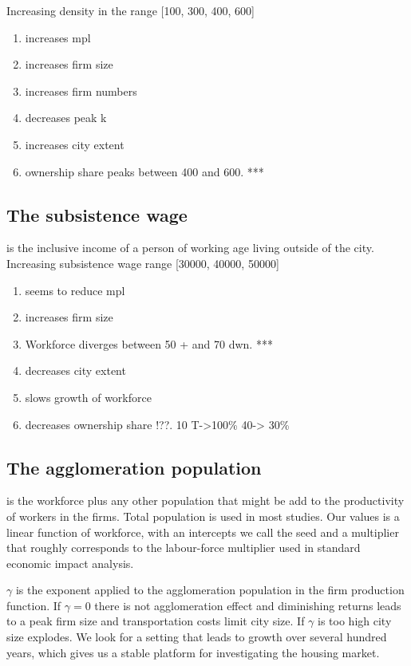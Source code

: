 Increasing density in the range [100, 300, 400, 600]    \begin{enumerate}
        \item increases mpl
        \item increases firm size
        \item increases firm numbers
        \item decreases peak k
        \item increases city extent
        \item ownership share peaks between 400 and 600. ***
    \end{enumerate}


\subsection{The subsistence wage} is the inclusive income of a person of working age  living outside of the city. 
Increasing subsistence wage range [30000, 40000, 50000]
    \begin{enumerate}
        \item seems to reduce mpl
        \item increases firm size 
        \item Workforce diverges between 50 + and 70 dwn. ***
        \item decreases city extent
        \item slows growth of workforce
        \item decreases ownership share !??. 10 T->100\%  40-> 30\%
    \end{enumerate}
    
\subsection{The agglomeration population} is the workforce plus any other population that might be add to the productivity of workers in the firms. Total population is used in most studies. Our values is a linear function of workforce, with an intercepts we call the seed and a multiplier that roughly corresponds to the labour-force multiplier used in standard economic impact analysis. 

$\gamma$ is the exponent applied to the agglomeration population in the firm production function. If  $\gamma =0$  there is not agglomeration effect and diminishing returns  leads to a peak firm size and transportation costs limit city size. If  $\gamma$ is too high city size explodes. We look for a setting that leads to growth over several hundred years, which gives us a stable platform for investigating the housing market.

